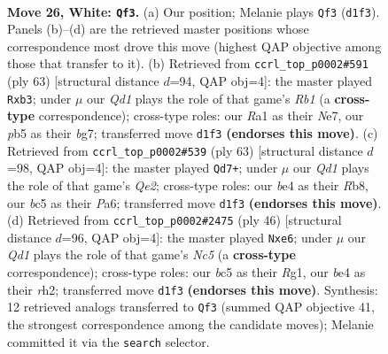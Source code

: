 \documentclass[11pt]{article}
\begin{document}
\clearpage

\begin{figure}[p]\centering
\begin{subfigure}{0.46\textwidth}\centering
\resizebox{\linewidth}{!}{%
\newchessgame
\chessboard[
  setfen={1n2k3/8/8/ppb2p2/4b3/8/PN3r2/R2Q1R1K w - - 0 26},
  showmover=false,
  pgfstyle=straightmove, color=movearrow, markmove={d1-f3}
]}
\caption{}
\end{subfigure}\hfill
\begin{subfigure}{0.46\textwidth}\centering
\resizebox{\linewidth}{!}{%
\newchessgame
\chessboard[
  setfen={1r1r4/4n1Bp/3k4/2p5/2B5/1R4P1/P4P1P/6K1 b - - 4 32},
  showmover=false,
  pgfstyle=straightmove, color=movearrow, markmove={b8-b3}
]}
\caption{}
\end{subfigure}
\\[4pt]
\begin{subfigure}{0.46\textwidth}\centering
\resizebox{\linewidth}{!}{%
\newchessgame
\chessboard[
  setfen={1r4rk/4q2p/p7/3Pp3/4B3/4B2K/PP3P2/R2Q4 b - - 2 32},
  showmover=false,
  pgfstyle=straightmove, color=movearrow, markmove={e7-d7}
]}
\caption{}
\end{subfigure}\hfill
\begin{subfigure}{0.46\textwidth}\centering
\resizebox{\linewidth}{!}{%
\newchessgame
\chessboard[
  setfen={2k5/5pp1/p1prb3/2N5/8/2P5/PP5r/2K1R1R1 w - - 0 24},
  showmover=false,
  pgfstyle=straightmove, color=movearrow, markmove={c5-e6}
]}
\caption{}
\end{subfigure}
\caption{\textbf{Move 26, White: \texttt{Qf3}.} (a) Our position; Melanie plays \texttt{Qf3} (\texttt{d1f3}). Panels (b)--(d) are the retrieved master positions whose correspondence most drove this move (highest QAP objective among those that transfer to it). (b) Retrieved from \texttt{ccrl\_top\_p0002\#591} (ply 63) [structural distance $d$=94, QAP obj=4]: the master played \texttt{Rxb3}; under $\mu$ our \emph{Qd1} plays the role of that game's \emph{Rb1} (a \textbf{cross-type} correspondence); cross-type roles: our \emph{R}a1 as their \emph{N}e7, our \emph{p}b5 as their \emph{b}g7; transferred move \texttt{d1f3} \textbf{(endorses this move)}. (c) Retrieved from \texttt{ccrl\_top\_p0002\#539} (ply 63) [structural distance $d$=98, QAP obj=4]: the master played \texttt{Qd7+}; under $\mu$ our \emph{Qd1} plays the role of that game's \emph{Qe2}; cross-type roles: our \emph{b}e4 as their \emph{R}b8, our \emph{b}c5 as their \emph{P}a6; transferred move \texttt{d1f3} \textbf{(endorses this move)}. (d) Retrieved from \texttt{ccrl\_top\_p0002\#2475} (ply 46) [structural distance $d$=96, QAP obj=4]: the master played \texttt{Nxe6}; under $\mu$ our \emph{Qd1} plays the role of that game's \emph{Nc5} (a \textbf{cross-type} correspondence); cross-type roles: our \emph{b}c5 as their \emph{R}g1, our \emph{b}e4 as their \emph{r}h2; transferred move \texttt{d1f3} \textbf{(endorses this move)}. Synthesis: 12 retrieved analogs transferred to \texttt{Qf3} (summed QAP objective 41, the strongest correspondence among the candidate moves); Melanie committed it via the \texttt{search} selector.}
\label{fig:thought-m50}
\end{figure}
\end{document}
